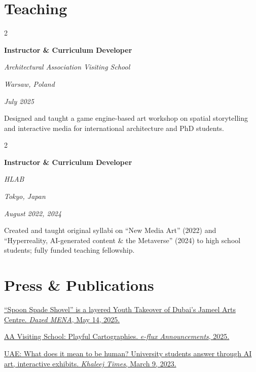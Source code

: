 \documentclass[11pt,a4paper]{article}
\newenvironment{onecolentry}{
    \vspace{0.1em}
}{
    \vspace{0.1em}
}
\newenvironment{twocolentry}[2][]{
    \needspace{4\baselineskip}%
    \onecolentry
    \def\secondColumn{#2}
    \setcolumnwidth{\fill, 5.0 cm}
    \begin{paracol}{2}
}{
    \switchcolumn \raggedleft \secondColumn
    \end{paracol}
    \endonecolentry
}
\begin{document}
\section*{Teaching}

\begin{twocolentry}{
    \textit{Warsaw, Poland}

    \textit{July 2025}
}
    \textbf{Instructor \& Curriculum Developer}

    \textit{Architectural Association Visiting School}
\end{twocolentry}
\vspace{0.10 cm}
\begin{onecolentry}
    Designed and taught a game engine-based art workshop on spatial storytelling and interactive media for international architecture and PhD students.
\end{onecolentry}

\begin{twocolentry}{
    \textit{Tokyo, Japan}

    \textit{August 2022, 2024}
}
    \textbf{Instructor \& Curriculum Developer}

    \textit{HLAB}
\end{twocolentry}
\vspace{0.10 cm}
\begin{onecolentry}
    Created and taught original syllabi on ``New Media Art'' (2022) and ``Hyperreality, AI-generated content \& the Metaverse'' (2024) to high school students; fully funded teaching fellowship.
\end{onecolentry}

\section*{Press \& Publications}

\href{https://www.dazed.me/news/spoon-spade-shovel-is-a-layered-youth-takeover-of-dubais-jameel-arts-centre}{``Spoon Spade Shovel'' is a layered Youth Takeover of Dubai's Jameel Arts Centre. \textit{Dazed MENA}, May 14, 2025.}

\href{https://www.e-flux.com/announcements/6783946/aa-visiting-school-playful-cartographies}{AA Visiting School: Playful Cartographies. \textit{e-flux Announcements}, 2025.}

\href{https://www.khaleejtimes.com/lifestyle/arts/uae-what-does-it-mean-to-be-human-university-students-answer-through-ai-art-interactive-exhibits}{UAE: What does it mean to be human? University students answer through AI art, interactive exhibits. \textit{Khaleej Times}, March 9, 2023.}
\end{document}
